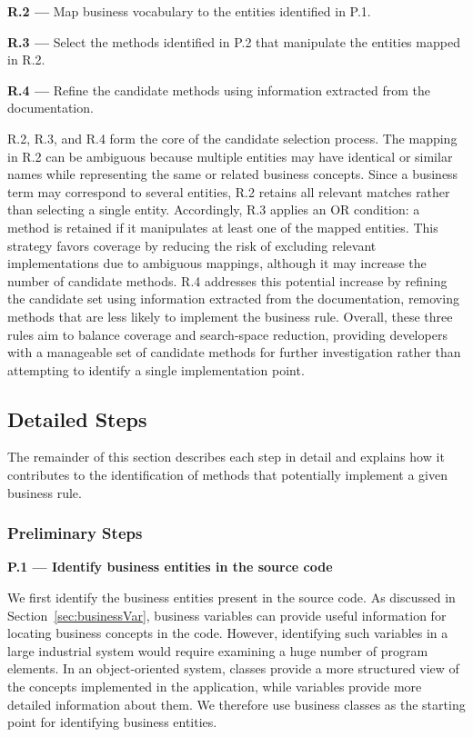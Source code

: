 \textbf{R.2 — } Map business vocabulary to the entities identified in P.1.

\textbf{R.3 — } Select the methods identified in P.2 that manipulate the entities mapped in R.2.

\textbf{R.4 — } Refine the candidate methods using information extracted from the documentation.
      
R.2, R.3, and R.4 form the core of the candidate selection process. The mapping in R.2 can be ambiguous because multiple entities may have identical or similar names while representing the same or related business concepts. Since a business term may correspond to several entities, R.2 retains all relevant matches rather than selecting a single entity. Accordingly, R.3 applies an OR condition: a method is retained if it manipulates at least one of the mapped entities. This strategy favors coverage by reducing the risk of excluding relevant implementations due to ambiguous mappings, although it may increase the number of candidate methods. R.4 addresses this potential increase by refining the candidate set using information extracted from the documentation, removing methods that are less likely to implement the business rule. Overall, these three rules aim to balance coverage and search-space reduction, providing developers with a manageable set of candidate methods for further investigation rather than attempting to identify a single implementation point.

\subsection{Detailed Steps}

The remainder of this section describes each step in detail and explains how it contributes to the identification of methods that potentially implement a given business rule.

\subsubsection{Preliminary Steps}\noindent

\textbf{P.1 — Identify business entities in the source code}

We first identify the business entities present in the source code. As discussed in Section~\ref{sec:businessVar}, business variables can provide useful information for locating business concepts in the code. However, identifying such variables in a large industrial system would require examining a huge number of program elements. In an object-oriented system, classes provide a more structured view of the concepts implemented in the application, while variables provide more detailed information about them. We therefore use business classes as the starting point for identifying business entities.

